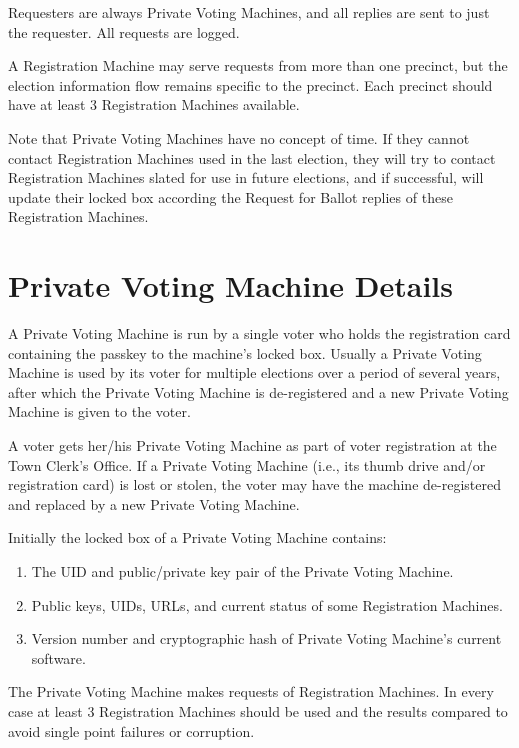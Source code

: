 \documentclass[12pt]{article}
\begin{document}
Requesters are always Private Voting Machines, and all replies
are sent to just the requester.  All requests are logged.

A Registration Machine may serve requests from more than
one precinct, but the election information flow remains specific
to the precinct.  Each precinct should have at least 3
Registration Machines available.

Note that Private Voting Machines have no concept of time.
If they cannot contact Registration Machines used in the last
election, they will try to contact Registration Machines
slated for use in future elections, and if successful, will
update their locked box according the Request for Ballot
replies of these Registration Machines.

\section{Private Voting Machine Details}

A Private Voting Machine is run by a single voter
who holds the registration card containing the passkey to
the machine's locked box.  Usually a Private Voting Machine
is used by its voter for multiple elections over a period
of several years, after which the Private Voting Machine
is de-registered and a new Private Voting Machine
is given to the voter.

A voter gets her/his Private Voting Machine as part of voter
registration at the Town Clerk's Office.
If a Private Voting Machine (i.e., its thumb drive and/or registration
card) is lost or stolen, the voter may have the machine
de-registered and replaced by a new Private Voting Machine.

Initially the locked box of a Private Voting Machine contains:
\begin{enumerate}
\item The UID and public/private key pair of the Private Voting Machine.
\item Public keys, UIDs, URLs, and current status of some Registration Machines.
\item Version number and cryptographic hash of Private Voting Machine's current
      software.
\setcounter{PVM-COUNTER}{\value{enumi}}
\end{enumerate}

The Private Voting Machine
makes requests of Registration Machines.  In every case
at least 3 Registration Machines should be used and the
results compared to avoid single point failures or corruption.
\end{document}
